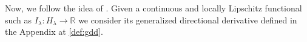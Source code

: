 \documentclass[11pt]{amsart}
\numberwithin{equation}{section} %
\newtheorem{lemma}[teo]{Lemma}
\theoremstyle{definition}
\def\R{\mathbb{R}}
\newcommand{\cor}{\textit}
\newcommand{\fine}{\qed\newline}
\begin{document}
Now,
we follow the idea of \cite[Lemma 3.5]{BadTar}.
Given a continuous and locally Lipschitz functional
such as $I_\lambda\colon {H_\lambda}\to \R$
we consider its generalized directional derivative
defined in the Appendix at \eqref{def:gdd}.
%
\end{document}
